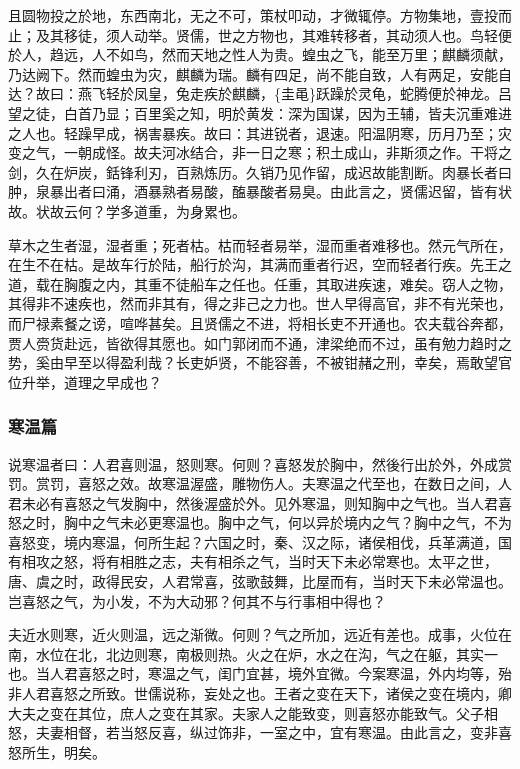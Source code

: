 \documentclass[]{article}
\begin{document}
且圆物投之於地，东西南北，无之不可，策杖叩动，才微辄停。方物集地，壹投而止；及其移徒，须人动举。贤儒，世之方物也，其难转移者，其动须人也。鸟轻便於人，趋远，人不如鸟，然而天地之性人为贵。蝗虫之飞，能至万里；麒麟须献，乃达阙下。然而蝗虫为灾，麒麟为瑞。麟有四足，尚不能自致，人有两足，安能自达？故曰：燕飞轻於凤皇，兔走疾於麒麟，\{圭黾\}跃躁於灵龟，蛇腾便於神龙。吕望之徒，白首乃显；百里奚之知，明於黄发：深为国谋，因为王辅，皆夫沉重难进之人也。轻躁早成，祸害暴疾。故曰：其进锐者，退速。阳温阴寒，历月乃至；灾变之气，一朝成怪。故夫河冰结合，非一日之寒；积土成山，非斯须之作。干将之剑，久在炉炭，銛锋利刃，百熟炼历。久销乃见作留，成迟故能割断。肉暴长者曰肿，泉暴出者曰涌，酒暴熟者易酸，醢暴酸者易臭。由此言之，贤儒迟留，皆有状故。状故云何？学多道重，为身累也。

草木之生者湿，湿者重；死者枯。枯而轻者易举，湿而重者难移也。然元气所在，在生不在枯。是故车行於陆，船行於沟，其满而重者行迟，空而轻者行疾。先王之道，载在胸腹之内，其重不徒船车之任也。任重，其取进疾速，难矣。窃人之物，其得非不速疾也，然而非其有，得之非己之力也。世人早得高官，非不有光荣也，而尸禄素餐之谤，喧哗甚矣。且贤儒之不进，将相长吏不开通也。农夫载谷奔都，贾人赍货赴远，皆欲得其愿也。如门郭闭而不通，津梁绝而不过，虽有勉力趋时之势，奚由早至以得盈利哉？长吏妒贤，不能容善，不被钳赭之刑，幸矣，焉敢望官位升举，道理之早成也？

\hypertarget{header-n595}{%
\subsubsection{寒温篇}\label{header-n595}}

说寒温者曰：人君喜则温，怒则寒。何则？喜怒发於胸中，然後行出於外，外成赏罚。赏罚，喜怒之效。故寒温渥盛，雕物伤人。夫寒温之代至也，在数日之间，人君未必有喜怒之气发胸中，然後渥盛於外。见外寒温，则知胸中之气也。当人君喜怒之时，胸中之气未必更寒温也。胸中之气，何以异於境内之气？胸中之气，不为喜怒变，境内寒温，何所生起？六国之时，秦、汉之际，诸侯相伐，兵革满道，国有相攻之怒，将有相胜之志，夫有相杀之气，当时天下未必常寒也。太平之世，唐、虞之时，政得民安，人君常喜，弦歌鼓舞，比屋而有，当时天下未必常温也。岂喜怒之气，为小发，不为大动邪？何其不与行事相中得也？

夫近水则寒，近火则温，远之渐微。何则？气之所加，远近有差也。成事，火位在南，水位在北，北边则寒，南极则热。火之在炉，水之在沟，气之在躯，其实一也。当人君喜怒之时，寒温之气，闺门宜甚，境外宜微。今案寒温，外内均等，殆非人君喜怒之所致。世儒说称，妄处之也。王者之变在天下，诸侯之变在境内，卿大夫之变在其位，庶人之变在其家。夫家人之能致变，则喜怒亦能致气。父子相怒，夫妻相督，若当怒反喜，纵过饰非，一室之中，宜有寒温。由此言之，变非喜怒所生，明矣。
\end{document}
